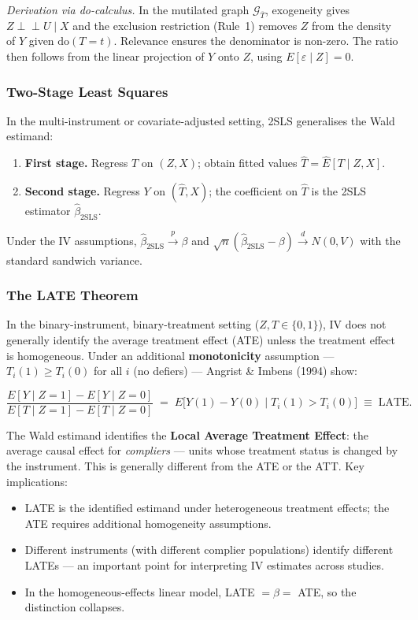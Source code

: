 \documentclass[12pt]{article}
\newcommand{\indep}{\perp\!\!\!\perp}
\begin{document}
\noindent\textit{Derivation via do-calculus.}  In the mutilated graph
$\mathcal{G}_{\overline{T}}$, exogeneity gives $Z \indep U \mid X$ and
the exclusion restriction (Rule~1) removes $Z$ from the density of $Y$
given $\mathrm{do}(T{=}t)$.  Relevance ensures the denominator is
non-zero.  The ratio then follows from the linear projection of $Y$ onto
$Z$, using $E[\varepsilon \mid Z] = 0$.

\subsubsection*{Two-Stage Least Squares}

In the multi-instrument or covariate-adjusted setting, 2SLS generalises
the Wald estimand:
\begin{enumerate}
  \item \textbf{First stage.}  Regress $T$ on $(Z, X)$; obtain fitted
    values $\hat{T} = \hat{E}[T \mid Z, X]$.
  \item \textbf{Second stage.}  Regress $Y$ on $(\hat{T}, X)$; the
    coefficient on $\hat{T}$ is the 2SLS estimator $\hat\beta_{\mathrm{2SLS}}$.
\end{enumerate}
Under the IV assumptions, $\hat\beta_{\mathrm{2SLS}} \xrightarrow{p} \beta$
and $\sqrt{n}(\hat\beta_{\mathrm{2SLS}} - \beta) \xrightarrow{d} N(0, V)$
with the standard sandwich variance.

\subsubsection*{The LATE Theorem}

In the binary-instrument, binary-treatment setting ($Z, T \in \{0,1\}$),
IV does not generally identify the average treatment effect (ATE) unless
the treatment effect is homogeneous.  Under an additional
\textbf{monotonicity} assumption --- $T_i(1) \geq T_i(0)$ for all $i$
(no defiers) --- Angrist \& Imbens (1994) show:

\begin{keybox}
\[
  \frac{E[Y \mid Z{=}1] - E[Y \mid Z{=}0]}
       {E[T \mid Z{=}1] - E[T \mid Z{=}0]}
  \;=\; E\!\bigl[Y(1) - Y(0) \;\big|\; T_i(1) > T_i(0)\bigr]
  \;\equiv\; \mathrm{LATE}.
\]
\end{keybox}

The Wald estimand identifies the \textbf{Local Average Treatment Effect}:
the average causal effect for \emph{compliers} --- units whose treatment
status is changed by the instrument.  This is generally different from the
ATE or the ATT.  Key implications:
\begin{itemize}
  \item LATE is the identified estimand under heterogeneous treatment effects;
    the ATE requires additional homogeneity assumptions.
  \item Different instruments (with different complier populations) identify
    different LATEs --- an important point for interpreting IV estimates
    across studies.
  \item In the homogeneous-effects linear model, LATE $= \beta =$ ATE, so
    the distinction collapses.
\end{itemize}
\end{document}
